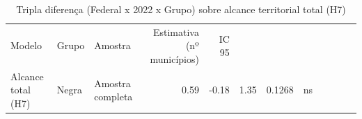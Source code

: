 \begin{table}[!h]
\centering
\caption{Tripla diferença (Federal x 2022 x Grupo) sobre alcance territorial total (H7)}
\centering
\begin{tabular}[t]{lllrrrrl}
\toprule
Modelo & Grupo & Amostra & Estimativa (nº municípios) & IC 95%
\midrule
{} &  &  &  &  &  &  & \\
Alcance total (H7) & Negra & Amostra completa & 0.59 & -0.18 & 1.35 & 0.1268 & ns\\
\bottomrule
\end{tabular}
\end{table}
